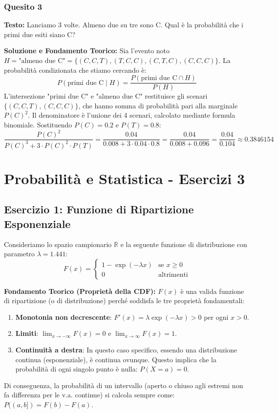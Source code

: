 \documentclass[12pt, a4paper]{article}
\begin{document}
\subsubsection*{Quesito 3}
\textbf{Testo:} Lanciamo 3 volte. Almeno due su tre sono C. Qual è la probabilità che i primi due esiti siano C?

\textbf{Soluzione e Fondamento Teorico:} 
Sia l'evento noto $H = \text{"almeno due C"} = \{(C,C,T), (T,C,C), (C,T,C), (C,C,C)\}$.
La probabilità condizionata che stiamo cercando è:
$$ P(\text{primi due C} \mid H) = \frac{P(\text{primi due C} \cap H)}{P(H)} $$
L'intersezione "primi due C" e "almeno due C" restituisce gli scenari $\{(C,C,T), (C,C,C)\}$, che hanno somma di probabilità pari alla marginale $P(C)^2$. Il denominatore è l'unione dei 4 scenari, calcolato mediante formula binomiale. Sostituendo $P(C) = 0.2$ e $P(T) = 0.8$:
$$ \frac{P(C)^2}{P(C)^3 + 3 \cdot P(C)^2 \cdot P(T)} = \frac{0.04}{0.008 + 3 \cdot 0.04 \cdot 0.8} = \frac{0.04}{0.008 + 0.096} = \frac{0.04}{0.104} \approx 0.3846154 $$


\section*{Probabilità e Statistica - Esercizi 3}

\subsection*{Esercizio 1: Funzione di Ripartizione Esponenziale}
Consideriamo lo spazio campionario $\mathbb{R}$ e la seguente funzione di distribuzione con parametro $\lambda = 1.441$:
$$
F(x) = 
\begin{cases} 
1 - \exp(-\lambda x) & \text{se } x \ge 0 \\
0 & \text{altrimenti}
\end{cases}
$$

\textbf{Fondamento Teorico (Proprietà della CDF):}
$F(x)$ è una valida funzione di ripartizione (o di distribuzione) perché soddisfa le tre proprietà fondamentali:
\begin{enumerate}
    \item \textbf{Monotonia non decrescente}: $F'(x) = \lambda \exp(-\lambda x) > 0$ per ogni $x > 0$.
    \item \textbf{Limiti}: $\lim_{x \to -\infty} F(x) = 0$ e $\lim_{x \to \infty} F(x) = 1$.
    \item \textbf{Continuità a destra}: In questo caso specifico, essendo una distribuzione continua (esponenziale), è continua ovunque. Questo implica che la probabilità di ogni singolo punto è nulla: $P(X = a) = 0$.
\end{enumerate}
Di conseguenza, la probabilità di un intervallo (aperto o chiuso agli estremi non fa differenza per le v.a. continue) si calcola sempre come: $P((a,b]) = F(b) - F(a)$.
\end{document}
